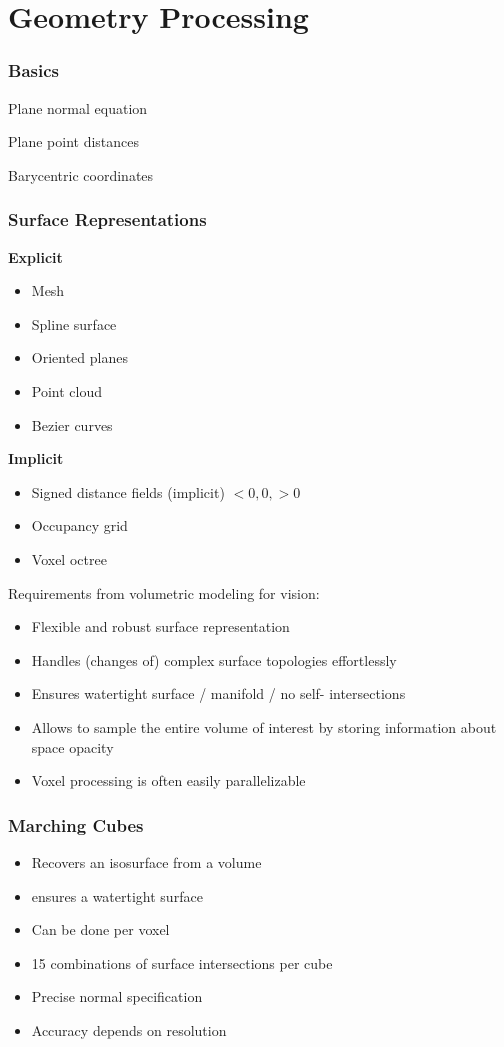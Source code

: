 \part{Geometry Processing} 

\section{Basics}

Plane normal equation

Plane point distances

Barycentric coordinates

\section{Surface Representations}

\textbf{Explicit}
\begin{itemize}
\item Mesh
\item Spline surface
\item Oriented planes
\item Point cloud
\item Bezier curves
\end{itemize}

\textbf{Implicit}
\begin{itemize}
\item Signed distance fields (implicit) $<0, 0, >0$
\item Occupancy grid
\item Voxel octree
\end{itemize}

Requirements from volumetric modeling for vision:
\begin{itemize}
\item Flexible and robust surface representation
\item Handles (changes of) complex surface topologies effortlessly
\item Ensures watertight surface / manifold / no self- intersections
\item Allows to sample the entire volume of interest by storing information about space opacity
\item Voxel processing is often easily parallelizable
\end{itemize}

\section{Marching Cubes}
\begin{itemize}
\item Recovers an isosurface from a volume
\item ensures a watertight surface
\item Can be done per voxel
\item 15 combinations of surface intersections per cube
\item Precise normal specification
\item Accuracy depends on resolution
\end{itemize}

